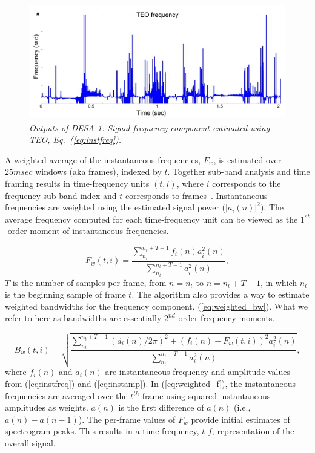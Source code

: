 {\begin{figure}[h!]
	\centering
	\includegraphics[height=2in, width=1\textwidth]{figures/teo_freq}
	\caption{\it Outputs of DESA-1: Signal frequency component estimated using TEO,  Eq.~(\ref{eq:instfreq}).}
\end{figure}

A weighted average of the instantaneous frequencies, $F_w$, is estimated over $25msec$ windows (aka frames), indexed by $t$. 
Together sub-band analysis and time framing results in time-frequency units $(t,i)$, where $i$ corresponds to the frequency sub-band index and $t$ corresponds to frames~\cite{cohenlee90}.
Instantaneous frequencies are weighted using the estimated signal power ($|a_i(n)|^2$). 
The average frequency computed for each time-frequency unit can be viewed as the $1^{st}$-order moment of instantaneous frequencies.  


\begin{equation}
\label{eq:weighted_f}
F_w(t,i) = \frac{\sum_{n_t}^{n_t+T - 1}f_i(n)a_i^2(n)}{\sum_{n_t}^{n_t+T - 1}a_i^2(n)},
\end{equation}
$T$ is the number of samples per frame, from $n = n_t$ to $n = n_t+T - 1$, in which $n_t$ is the beginning sample of frame $t$. 
The algorithm also provides a way to estimate weighted bandwidths for the frequency component, (\ref{eq:weighted_bw}). 
What we refer to here as bandwidths are essentially $2^{nd}$-order frequency moments. 

\begin{equation}
\label{eq:weighted_bw}
B_w(t,i) = \sqrt{\frac{\sum_{n_t}^{n_t+T-1}(\overset{\boldsymbol .}{a_i}(n) /2\pi)^2+(f_i(n)-F_w(t,i))^2a_i^2(n)}{\sum_{n_t}^{n_t+T-1}a_i^2(n)}},
\end{equation}
where $f_i(n)$ and $a_i(n)$ are instantaneous frequency and amplitude values from (\ref{eq:instfreq}) and (\ref{eq:instamp}). 
In (\ref{eq:weighted_f}), the instantaneous frequencies are averaged over the $t^{th}$ frame using squared instantaneous amplitudes as weights. 
$\overset{\boldsymbol .}{a}(n)$ is the first difference of $a(n)$ (i.e., $a(n) - a(n-1)$). 
The per-frame values of $F_w$ provide initial estimates of spectrogram peaks. 
This results in a time-frequency, {$t$-$f$}, representation of the overall signal. 


}

